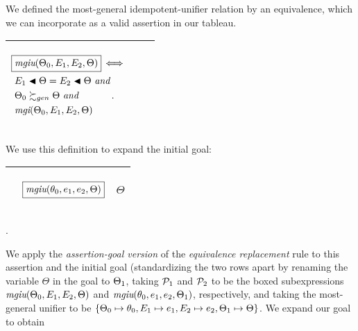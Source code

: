 \documentclass[runningheads]{llncs}
\DeclareMathOperator{\uand}{\emph{and}\,}
\DeclareMathOperator{\uiff}{\iff}
\DeclareMathOperator{\mgi}{\emph{mgi}}
\DeclareMathOperator{\mgiu}{\emph{mgiu}}
\begin{document}
  We defined the most-general idempotent-unifier relation by an equivalence, which we can incorporate as a valid assertion in our tableau.
    \begin{center}
  \begin{tabular} {|m{}|m{}||m{}|}
\hline
 \begin{center} 
${\begin{aligned} 
&\boxed{\mgiu(\Thet{0}, \E{1}, \E{2}, \Theta)} \uiff \\
&\begin{aligned}
&\E{1} \apply \Theta = \E{2} \apply \Theta \, \uand 
 \\
 \,\, & \Thet{0} \moregen \Theta \, \uand
\\
  \,\, & {\mgi}(\Thet{0}, \E{1}, \E{2}, \Theta)
\end{aligned}.\end{aligned}}$\hspace{1cm} 
\end{center}& &  \\  \hline
\end{tabular}
\end{center}

\noindent   We use this definition to expand the initial goal: 
\begin{center}
\begin{tabular}{T}
\hline
  & \begin{center}$ \boxed{{\mgiu}(\thet{0}, \e{1}, \e{2} , \Theta)}$  \end{center}  & \begin{center}$\Theta$\end{center} \\
\hline
\end{tabular}.
\end{center}
We apply the \emph{assertion-goal version} of the \emph{equivalence replacement} rule to this assertion and the initial goal (standardizing the two rows apart by renaming the variable $\Theta$ in the goal to $\Theta_{1}$, taking  ${\mathcal{P}}_{1}$ and  ${\mathcal{P}}_{2}$ to be the boxed subexpressions ${\mgiu}(\Thet{0}, \E{1}, \E{2}, \Theta)$ and $ {\mgiu}(\thet{0}, \e{1}, \e{2} , \Thet{1})$, respectively, and taking the most-general unifier to be $\{\Theta_{0} \mapsto \theta_{0}, E_{1} \mapsto e_{1}, E_{2} \mapsto e_{2}, \Theta_{1} \mapsto \Theta\}$. We expand our goal to obtain
\end{document}
